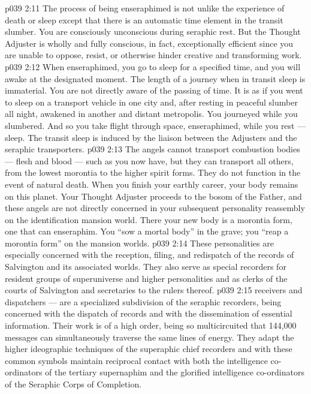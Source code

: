 \vs p039 2:11 The process of being enseraphimed is not unlike the experience of death or sleep except that there is an automatic time element in the transit slumber. You are consciously unconscious during seraphic rest. But the Thought Adjuster is wholly and fully conscious, in fact, exceptionally efficient since you are unable to oppose, resist, or otherwise hinder creative and transforming work.
\vs p039 2:12 When enseraphimed, you go to sleep for a specified time, and you will awake at the designated moment. The length of a journey when in transit sleep is immaterial. You are not directly aware of the passing of time. It is as if you went to sleep on a transport vehicle in one city and, after resting in peaceful slumber all night, awakened in another and distant metropolis. You journeyed while you slumbered. And so you take flight through space, enseraphimed, while you rest --- sleep. The transit sleep is induced by the liaison between the Adjusters and the seraphic transporters.
\vs p039 2:13 \pc The angels cannot transport combustion bodies --- flesh and blood --- such as you now have, but they can transport all others, from the lowest morontia to the higher spirit forms. They do not function in the event of natural death. When you finish your earthly career, your body remains on this planet. Your Thought Adjuster proceeds to the bosom of the Father, and these angels are not directly concerned in your subsequent personality reassembly on the identification mansion world. There your new body is a morontia form, one that can enseraphim. You “sow a mortal body” in the grave; you “reap a morontia form” on the mansion worlds.
\vs p039 2:14 \bibnobreakspace {} These personalities are especially concerned with the reception, filing, and redispatch of the records of Salvington and its associated worlds. They also serve as special recorders for resident groups of superuniverse and higher personalities and as clerks of the courts of Salvington and secretaries to the rulers thereof.
\vs p039 2:15 \pc {} receivers and dispatchers --- are a specialized subdivision of the seraphic recorders, being concerned with the dispatch of records and with the dissemination of essential information. Their work is of a high order, being so multicircuited that 144,000 messages can simultaneously traverse the same lines of energy. They adapt the higher ideographic techniques of the superaphic chief recorders and with these common symbols maintain reciprocal contact with both the intelligence co\hyp{}ordinators of the tertiary supernaphim and the glorified intelligence co\hyp{}ordinators of the Seraphic Corps of Completion.
